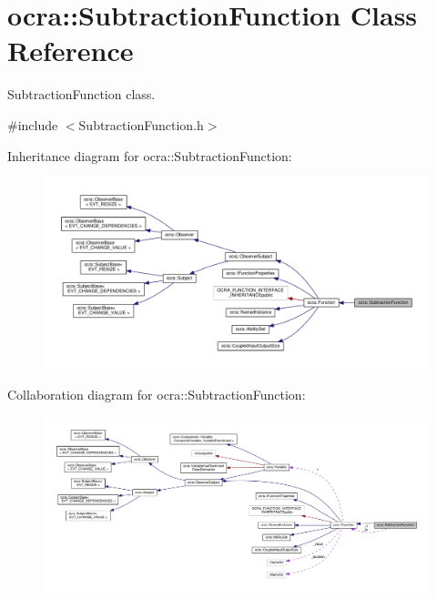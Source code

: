 \hypertarget{classocra_1_1SubtractionFunction}{}\section{ocra\+:\+:Subtraction\+Function Class Reference}
\label{classocra_1_1SubtractionFunction}


Subtraction\+Function class.  




{\ttfamily \#include $<$Subtraction\+Function.\+h$>$}



Inheritance diagram for ocra\+:\+:Subtraction\+Function\+:
\nopagebreak
\begin{figure}[H]
\begin{center}
\leavevmode
\includegraphics[width=350pt]{d6/d6b/classocra_1_1SubtractionFunction__inherit__graph}
\end{center}
\end{figure}


Collaboration diagram for ocra\+:\+:Subtraction\+Function\+:
\nopagebreak
\begin{figure}[H]
\begin{center}
\leavevmode
\includegraphics[width=350pt]{db/ddf/classocra_1_1SubtractionFunction__coll__graph}
\end{center}
\end{figure}
